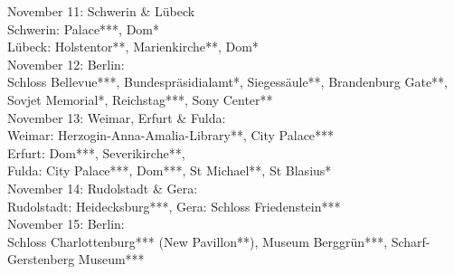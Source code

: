 November 11: Schwerin \& L\"ubeck\\
Schwerin: Palace***, Dom*\\
 L\"ubeck: Holstentor**, Marienkirche**, Dom*\\

November 12: Berlin:\\
Schloss Bellevue***, Bundespr\"asidialamt*, Siegess\"aule**, Brandenburg Gate**, Sovjet Memorial*, Reichstag***, Sony Center**\\

November 13: Weimar, Erfurt \& Fulda:\\
Weimar: Herzogin-Anna-Amalia-Library**, City Palace***\\
Erfurt: Dom***, Severikirche**, \\
Fulda: City Palace***, Dom***, St Michael**, St Blasius*\\

November 14: Rudolstadt \& Gera:\\
Rudolstadt: Heidecksburg***, Gera: Schloss Friedenstein***\\

November 15: Berlin:\\
Schloss Charlottenburg*** (New Pavillon**), Museum Berggr\"un***, Scharf-Gerstenberg Museum***